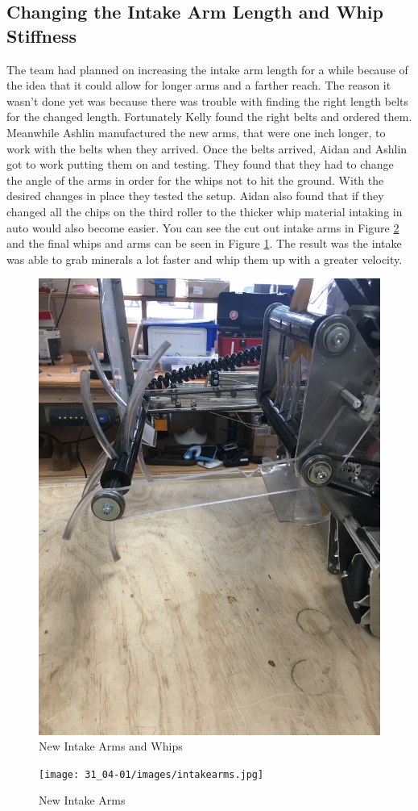 \documentclass{article}
\begin{document}
\subsection{Changing the Intake Arm Length and Whip Stiffness}
The team had planned on increasing the intake arm length for a while because of the idea that it could allow for longer arms and a farther reach. The reason it wasn't done yet was because there was trouble with finding the right length belts for the changed length. Fortunately Kelly found the right belts and ordered them. Meanwhile Ashlin manufactured the new arms, that were one inch longer, to work with the belts when they arrived. Once the belts arrived, Aidan and Ashlin got to work putting them on and testing. They found that they had to change the angle of the arms in order for the whips not to hit the ground. With the desired changes in place they tested the setup. Aidan also found that if they changed all the chips on the third roller to the thicker whip material intaking in auto would also become easier. You can see the cut out intake arms in Figure \ref{fig:intakearms} and the final whips and arms can be seen in Figure \ref{fig:arms}. The result was the intake was able to grab minerals a lot faster and whip them up with a greater velocity.

\begin{figure}
    \centering
    \includegraphics[width= 0.5 \textwidth]{31_04-01/images/IMG_1934.JPG}
    \caption{New Intake Arms and Whips}
    \label{fig:arms}
\end{figure}

\begin{figure}
    \centering
    \texttt{[image: 31\_04-01/images/intakearms.jpg]}
    \caption{New Intake Arms}
    \label{fig:intakearms}
\end{figure}
\end{document}
